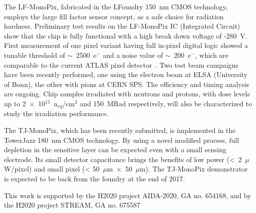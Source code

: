 \documentclass[a4paper,11pt]{article}
\begin{document}
The LF-MonoPix, fabricated in the LFoundry 150~nm CMOS technology, employs the large fill factor sensor concept, as a safe choice for radiation hardness. Preliminary test results on the LF-MonoPix IC (Integrated Circuit) show that the chip is fully functional with a high break down voltage of -280~V. First measurement of one pixel variant having full in-pixel digital logic showed a tunable threshold of $\sim$~2500~e$^{-}$ and a noise value of $\sim$~200~e$^{-}$, which are comparable to the current ATLAS pixel detector~\cite{ATLASPixelPerformance_Heim_2014}. Two test beam campaigns have been recently performed, one using the electron beam at ELSA (University of Bonn), the other with pions at CERN SPS. The efficiency and timing analysis are ongoing. Chip samples irradiated with neutrons and protons, with dose levels up to 2~$\times$~10$^{15}$~n$_{eq}$/cm$^{2}$ and 150~MRad respectively, will also be characterized to study the irradiation performance. 

The TJ-MonoPix, which has been recently submitted, is implemented in the TowerJazz 180~nm CMOS technology. By using a novel modified process, full depletion in the sensitive layer can be expected even with a small sensing electrode. Its small detector capacitance brings the benefits of low power (<~2~$\mu$W/pixel) and small pixel (< 50~$\mu$m~$\times$~50~$\mu$m). The TJ-MonoPix demonstrator is expected to be back from the foundry at the end of 2017. 

\acknowledgments

This work is supported by the H2020 project AIDA-2020, GA no. 654168, and by the H2020 project STREAM, GA no. 675587
\end{document}
